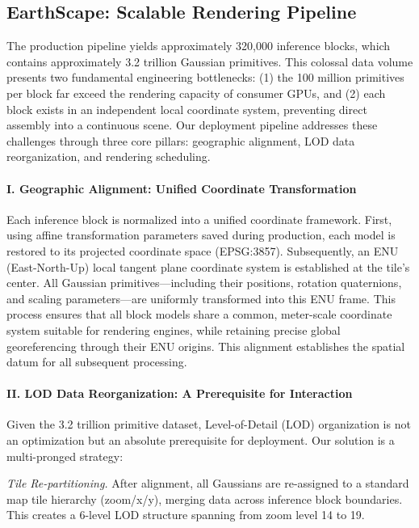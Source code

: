 \subsection{EarthScape: Scalable Rendering Pipeline}

The production pipeline yields approximately 320,000 inference blocks, which contains approximately 3.2 trillion Gaussian primitives. This colossal data volume presents two fundamental engineering bottlenecks: (1) the 100 million primitives per block far exceed the rendering capacity of consumer GPUs, and (2) each block exists in an independent local coordinate system, preventing direct assembly into a continuous scene. Our deployment pipeline addresses these challenges through three core pillars: geographic alignment, LOD data reorganization, and rendering scheduling.

\paragraph{I. Geographic Alignment: Unified Coordinate Transformation}
Each inference block is normalized into a unified coordinate framework. First, using affine transformation parameters saved during production, each model is restored to its projected coordinate space (EPSG:3857). Subsequently, an ENU (East-North-Up) local tangent plane coordinate system is established at the tile's center. All Gaussian primitives—including their positions, rotation quaternions, and scaling parameters—are uniformly transformed into this ENU frame. This process ensures that all block models share a common, meter-scale coordinate system suitable for rendering engines, while retaining precise global georeferencing through their ENU origins. This alignment establishes the spatial datum for all subsequent processing.

\paragraph{II. LOD Data Reorganization: A Prerequisite for Interaction}
Given the 3.2 trillion primitive dataset, Level-of-Detail (LOD) organization is not an optimization but an absolute prerequisite for deployment. Our solution is a multi-pronged strategy:

\textit{Tile Re-partitioning.} After alignment, all Gaussians are re-assigned to a standard map tile hierarchy (zoom/x/y), merging data across inference block boundaries. This creates a 6-level LOD structure spanning from zoom level 14 to 19.

